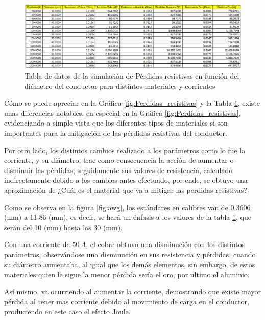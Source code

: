        \begin{figure}[H]
           \centering
           \setcounter{figure}{0}
           \renewcommand{\figurename}{Tabla}
           \includegraphics[width=\textwidth]{imagenes/sim_datos_perdidas.png}
           \caption{Tabla de datos de la simulación de Pérdidas resistivas en función del diámetro del conductor para distintos materiales y corrientes}
           \label{fig:sim_datos_perdidas}
       \end{figure}

      Cómo se puede apreciar en la Gráfica \ref{fig:Perdidas_resistivas} y la  Tabla \ref{fig:sim_datos_perdidas}, existe unas diferencias notables, en especial en la Gráfica \ref{fig:Perdidas_resistivas}, evidenciando a simple vista que los diferentes tipos de materiales si son importantes para la mitigación de las pérdidas resistivas del conductor. 

      Por otro lado, los distintos cambios realizado a los parámetros como lo fue la corriente, y su diámetro, trae como consecuencia la acción de aumentar o disminuir las pérdidas; seguidamente sus valores de resistencia, calculado indirectamente debido a los cambios antes efectuado, por ende, se obtuvo una aproximación de ¿Cuál es el material que va a mitigar las perdidas resistivas?

      Como se observa en la figura \ref{fig:awg}, los estándares en calibres van de 0.3606 (mm) a 11.86 (mm), es decir, se hará un énfasis a los valores de la tabla \ref{fig:sim_datos_perdidas}, que serán del 10 (mm) hasta los 30 (mm).

      Con una corriente de $50 \, A$, el cobre obtuvo una disminución con los distintos parámetros, observándose una disminución en sus resistencia y pérdidas, cuando su diámetro aumentaba, al igual que los demás elementos, sin embargo, de estos materiales quien le sigue la menor pérdida sería el oro, por ultimo el aluminio.

      Así mismo, va ocurriendo al aumentar la corriente, demostrando que existe mayor pérdida al tener mas corriente debido al movimiento de carga en el conductor, produciendo en este caso el efecto Joule.

      






\newpage